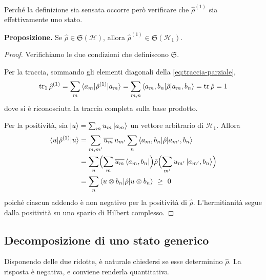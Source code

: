 Perché la definizione sia sensata occorre però verificare che
$\hat{\rho}^{(1)}$ sia effettivamente uno stato.
%
\begin{tcolorbox}[colback=black!5!white, colframe=black!45!white, boxrule=0.8pt]
\textbf{Proposizione.} Se $\hat{\rho} \in \mathfrak{S}(\mathcal{H})$,
allora $\hat{\rho}^{(1)} \in \mathfrak{S}(\mathcal{H}_1)$.
\end{tcolorbox}
%
\begin{proof}
Verifichiamo le due condizioni che definiscono $\mathfrak{S}$.

Per la traccia, sommando gli elementi diagonali della
\eqref{eq:traccia-parziale},
%
\begin{equation*}
    \operatorname{tr}_1 \hat{\rho}^{(1)} = \sum_m
    \braket{a_m | \hat{\rho}^{(1)} | a_m} = \sum_{m,n}
    \braket{a_m, b_n | \hat{\rho} | a_m, b_n}
    = \operatorname{tr} \hat{\rho} = 1
\end{equation*}
%
dove si è riconosciuta la traccia completa sulla base prodotto.

Per la positività, sia $\ket{u} = \sum_m u_m \ket{a_m}$ un vettore
arbitrario di $\mathcal{H}_1$. Allora
%
\begin{align*}
    \braket{u | \hat{\rho}^{(1)} | u}
    &= \sum_{m,m'} \overline{u_m} \, u_{m'} \sum_n
       \braket{a_m, b_n | \hat{\rho} | a_{m'}, b_n} \\
    &= \sum_n \Bigl( \sum_m \overline{u_m} \bra{a_m, b_n} \Bigr)
       \hat{\rho} \Bigl( \sum_{m'} u_{m'} \ket{a_{m'}, b_n} \Bigr) \\
    &= \sum_n \braket{u \otimes b_n | \hat{\rho} | u \otimes b_n}
    \ \geq \ 0
\end{align*}
%
poiché ciascun addendo è non negativo per la positività di $\hat{\rho}$.
L'hermitianità segue dalla positività su uno spazio di Hilbert
complesso.
\end{proof}

\subsection{Decomposizione di uno stato generico}

Disponendo delle due ridotte, è naturale chiedersi se esse determinino
$\hat{\rho}$. La risposta è negativa, e conviene renderla quantitativa.

